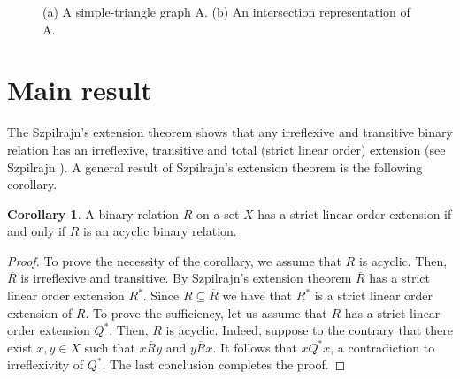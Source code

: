 \documentclass{article}
\theoremstyle{definition}
\newtheorem{corollary}[theorem]{Corollary}
\begin{document}
\begin{figure}
\par\bigskip\par
\caption{\small {(a) A simple-triangle graph A. (b) An intersection representation of A.} } \label{fig1: }
\end{figure}



\section{Main result}

The Szpilrajn's extension theorem shows that any irreflexive and transitive binary relation has an irreflexive, transitive and total (strict linear order)
extension (see Szpilrajn \cite{szp}). 
A general result of Szpilrajn's extension theorem is the following corollary.




\begin{corollary}\label{87}{\rm A binary relation $R$ on a set $X$ has a strict linear order extension 
if and only if
$R$ is an acyclic binary relation.}
\end{corollary}
\begin{proof} To prove the necessity of the corollary, we assume that $R$ is acyclic.
Then, $\overline{R}$ is irreflexive and transitive. 
By Szpilrajn’s extension theorem $\overline{R}$ has a
strict linear order extension $R^{\ast}$. Since $R\subseteq \overline{R}$ we have that
$R^{\ast}$ is a
strict linear order extension of $R$.
To prove the sufficiency, let us assume that $R$ has a strict linear order extension $Q^{\ast}$. Then, $R$ is acyclic. Indeed, suppose to the contrary that there exist 
$x, y\in X$ such that $x\overline{R}y$ and $y\overline{R}x$. It follows that
$x Q^{\ast} x$, a contradiction to irreflexivity of $Q^{\ast}$. The last conclusion completes the proof. 
\end{proof}
\end{document}
